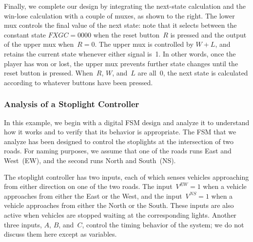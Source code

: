 \begin{minipage}{2.8in}
Finally, we complete our design by integrating the next-state
calculation and the win-lose calculation with a couple of muxes, as
shown to the right.
%
The lower mux controls the final value of the next state: note that
it selects between the constant state $FXGC=0000$ when the reset button~$R$
is pressed and the output of the upper mux when~$R=0$.
%
The upper mux is controlled by $W+L$, and retains the current state
whenever either signal is~1.  In other words, once the player has won
or lost, the upper mux prevents further state changes until the reset
button is pressed.
%
When~$R$, $W$, and~$L$ are all~0, the next state is calculated
according to whatever buttons have been pressed.
\end{minipage}\hspace{0.25in}%
\begin{minipage}{3.45in}
\end{minipage}\vspace{12pt}



\subsubsection{Analysis of a Stoplight Controller}

In this example, we begin with a digital FSM design and analyze it to
understand how it works and to verify that its behavior is appropriate.
%
The FSM that we analyze has been designed to control the stoplights
at the intersection of two roads.  For naming purposes, we assume that one
of the roads runs East and West~(EW), and the second runs North and 
South~(NS).  

The stoplight controller has two inputs, each of which 
senses vehicles approaching from either direction on one of the two roads.
The input~$V^{EW}=1$ when a vehicle approaches from either the East or the
West, and the input~$V^{NS}=1$ when a vehicle approaches from either the
North or the South.  These inputs are also active when vehicles are stopped
waiting at the corresponding lights.
%
Another three inputs, $A$, $B$, and~$C$, control the timing behavior of the
system; we do not discuss them here except as variables.

